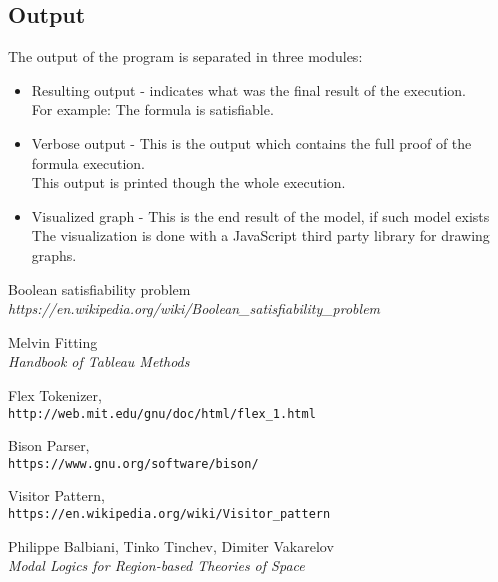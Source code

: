 \documentclass{article}
\begin{document}
		\subsection*{Output}
		The output of the program is separated in three modules:
		\begin{itemize}
			\item Resulting output - indicates what was the final result of the execution. \\
				For example: The formula is satisfiable.
			\item Verbose output - This is the output which contains the full proof of the formula execution. \\
				This output is printed though the whole execution.
			\item Visualized graph - This is the end result of the model, if such model exists \\
				The visualization is done with a JavaScript third party library for drawing graphs.
		\end{itemize}
	\newpage
	\begin{thebibliography}{9}
		Boolean satisfiability problem
		\\\textit{https://en.wikipedia.org/wiki/Boolean\_satisfiability\_problem}

		Melvin Fitting
		\\\textit{Handbook of Tableau Methods}

		Flex Tokenizer,
		\\\texttt{http://web.mit.edu/gnu/doc/html/flex\_1.html}

		Bison Parser,
		\\\texttt{https://www.gnu.org/software/bison/}

		Visitor Pattern,
		\\\texttt{https://en.wikipedia.org/wiki/Visitor\_pattern}

		Philippe Balbiani, Tinko Tinchev, Dimiter Vakarelov
		\\\textit{Modal Logics for Region-based Theories of Space}
	\end{thebibliography}
\end{document}
